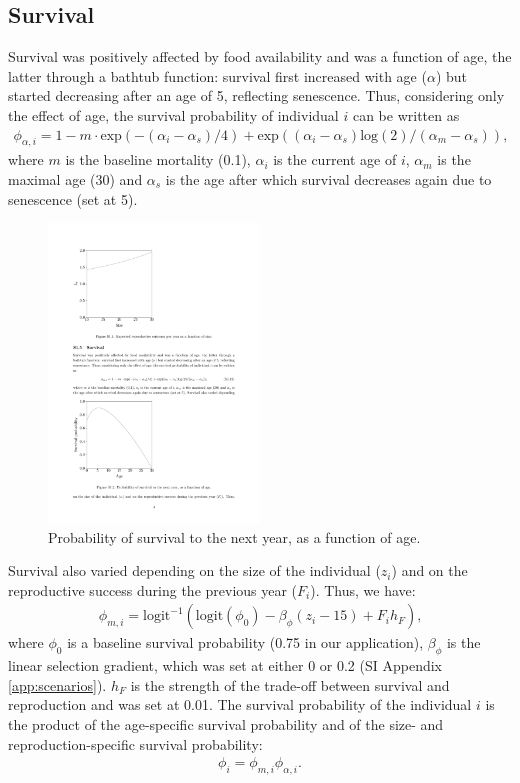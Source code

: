 \subsection{Survival} \label{app:simul:surv}
Survival was positively affected by food availability and was a function of age, the latter through a bathtub function: survival first increased with age ($\alpha$) but started decreasing after an age of 5, reflecting senescence.
Thus, considering only the effect of age, the survival probability of individual $i$ can be written as
\begin{align}
\phi_{\alpha,i} = 1 - m \cdot \mathrm{exp}(-(\alpha_i-\alpha_s)/4) + \mathrm{exp}((\alpha_i-\alpha_s)\mathrm{log}(2)/(\alpha_m-\alpha_s)) \text{,}
\end{align}
where $m$ is the baseline mortality (0.1), $\alpha_i$ is the current age of $i$, $\alpha_m$ is the maximal age (30) and $\alpha_s$ is the age after which survival decreases again due to senescence (set at 5).
\begin{figure}[ht]
\centering
	\includegraphics[width=0.5\textwidth]{Appendices/FigS2}
  \caption{\footnotesize Probability of survival to the next year, as a function of age.}
   \label{bathtub}
\end{figure}
Survival also varied depending on the size of the individual ($z_i$) and on the reproductive success during the previous year ($F_i$). Thus, we have:
\begin{align}
\phi_{m,i} = \mathrm{logit}^{-1}(\mathrm{logit}(\phi_0) - \beta_{\phi}(z_i-15)   + F_i h_F) \text{,}
\end{align}
where $\phi_0$ is a baseline survival probability (0.75 in our application), $\beta_{\phi}$ is the linear selection gradient, which was set at either 0 or 0.2 (SI Appendix \ref{app:scenarios}). $h_F$ is the strength of the trade-off between survival and reproduction and was set at 0.01. The survival probability of the individual $i$ is the product of the age-specific survival probability and of the size- and reproduction-specific survival probability:
\begin{align}
\phi_{i} = \phi_{m,i}\phi_{\alpha,i}\text{.}
\end{align}

